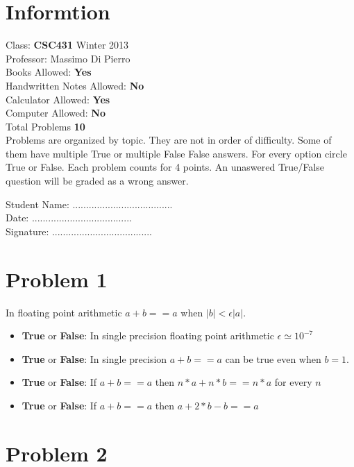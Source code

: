 \documentclass[12pt]{article}
\begin{document}
\section*{Informtion}

\noindent Class: {\bf CSC431} Winter 2013 \\
\noindent Professor: Massimo Di Pierro \\
\noindent Books Allowed: {\bf Yes} \\
\noindent Handwritten Notes Allowed: {\bf No} \\
\noindent Calculator Allowed: {\bf Yes} \\
\noindent Computer Allowed: {\bf No} \\
\noindent Total Problems {\bf 10} \\

Problems are organized by topic. They are not in order of difficulty. Some of them have multiple True or multiple False False answers. For every option circle True or False. Each problem counts for 4 points. An unaswered True/False question will be graded as a wrong answer.

\hskip 5cm

\noindent Student Name: ..................................... \\
\noindent Date: ..................................... \\
\noindent Signature: ..................................... \\

\newpage\section{Problem 1}

\noindent In floating point arithmetic $a+b==a$ when $|b|<\epsilon |a|$. 

\begin{itemize}
\item {\bf True} or {\bf False}: In single precision floating point arithmetic $\epsilon \simeq 10^{-7}$
\item {\bf True} or {\bf False}: In single precision $a+b==a$ can be true even when $b=1$.
\item {\bf True} or {\bf False}: If $a+b==a$ then $n*a + n*b == n*a$ for every $n$
\item {\bf True} or {\bf False}: If $a+b==a$ then $a+2*b-b==a$
\end{itemize}

\newpage\section{Problem 2}
\end{document}
